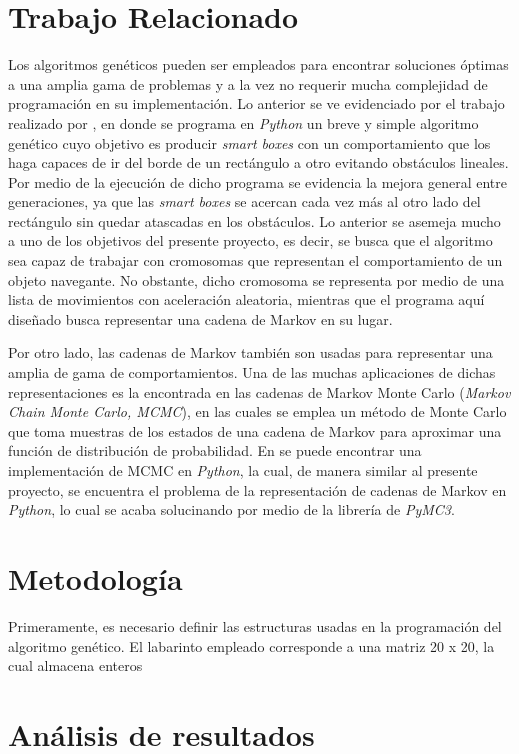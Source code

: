 \documentclass[conference]{IEEEtran}
\begin{document}
\section{Trabajo Relacionado}
Los algoritmos genéticos pueden ser empleados para encontrar soluciones óptimas a una amplia gama de problemas y a la vez no requerir mucha complejidad de programación en su implementación. Lo anterior se ve evidenciado por el trabajo realizado por \cite{b3}, en donde se programa en \textit{Python} un breve y simple algoritmo genético cuyo objetivo es producir \textit{smart boxes} con un comportamiento que los haga capaces de ir del borde de un rectángulo a otro evitando obstáculos lineales. Por medio de la ejecución de dicho programa se evidencia la mejora general entre generaciones, ya que las \textit{smart boxes} se acercan cada vez más al otro lado del rectángulo sin quedar atascadas en los obstáculos. Lo anterior se asemeja mucho a uno de los objetivos del presente proyecto, es decir, se busca que el algoritmo sea capaz de trabajar con cromosomas que representan el comportamiento de un objeto navegante. No obstante, dicho cromosoma se representa por medio de una lista de movimientos con aceleración aleatoria, mientras que el programa aquí diseñado busca representar una cadena de Markov en su lugar.

Por otro lado, las cadenas de Markov también son usadas para representar una amplia de gama de comportamientos. Una de las muchas aplicaciones de dichas representaciones es la encontrada en las cadenas de Markov Monte Carlo (\textit{Markov Chain Monte Carlo, MCMC}), en las cuales se emplea un método de Monte Carlo que toma muestras de los estados de una cadena de Markov para aproximar una función de distribución de probabilidad. En \cite{b4} se puede encontrar una implementación de MCMC en \textit{Python}, la cual, de manera similar al presente proyecto, se encuentra el problema de la representación de cadenas de Markov en \textit{Python}, lo cual se acaba solucinando por medio de la librería de  \textit{PyMC3}.  

\section{Metodología}

Primeramente, es necesario definir las estructuras usadas en la programación del algoritmo genético. El labarinto empleado corresponde a una matriz 20 x 20, la cual almacena enteros 


\section{Análisis de resultados}
\end{document}
